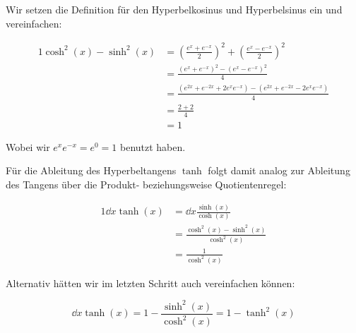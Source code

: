 \item Wir setzen die Definition für den Hyperbelkosinus und Hyperbelsinus ein und vereinfachen:

\begin{alignat*}{1}
	\cosh^2(x)-\sinh^2(x) &= \left(\frac{e^x+e^{-x}}{2}\right)^2 + \left(\frac{e^x-e^{-x}}{2}\right)^2 \\
	                      &= \frac{\left(e^x+e^{-x}\right)^2 - \left(e^x-e^{-x}\right)^2}{4} \\
	                      &= \frac{\left(e^{2x}+e^{-2x}+2e^xe^{-x}\right) - \left(e^{2x}+e^{-2x}-2e^xe^{-x}\right)}{4} \\
	                      &= \frac{2+2}{4} \\
	                      &= 1
\end{alignat*}

Wobei wir $e^xe^{-x} = e^0 = 1$ benutzt haben.

Für die Ableitung des Hyperbeltangens $\tanh$ folgt damit analog zur Ableitung des Tangens über die Produkt- beziehungsweise Quotientenregel:

\begin{alignat*}{1}
	\dd{}{x} \tanh(x) &= \dd{}{x} \frac{\sinh(x)}{\cosh(x)} \\
	                  &= \frac{\cosh^2(x)-\sinh^2(x)}{\cosh^2(x)} \\
	                  &= \frac{1}{\cosh^2(x)}
\end{alignat*}

Alternativ hätten wir im letzten Schritt auch vereinfachen können:

$$
	\dd{}{x} \tanh(x) = 1 - \frac{\sinh^2(x)}{\cosh^2(x)} = 1-\tanh^2(x)
$$

